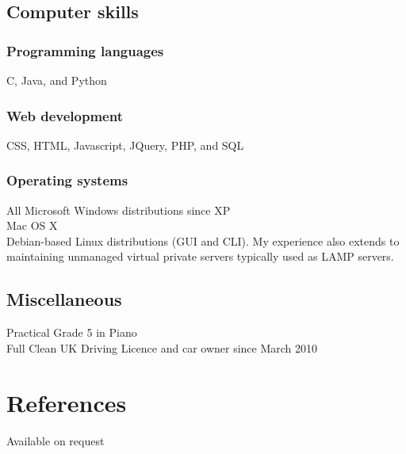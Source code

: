 \documentclass[10pt,a4paper]{article}
\begin{document}
\subsection*{Computer skills}
\subsubsection*{Programming languages}
C, Java, and Python
\subsubsection*{Web development}
CSS, HTML, Javascript, JQuery, PHP, and SQL
\subsubsection*{Operating systems}
All Microsoft Windows distributions since XP\\
Mac OS X\\
Debian-based Linux distributions (GUI and CLI). My experience also extends to 
maintaining unmanaged virtual private servers typically used as LAMP servers.
\subsection*{Miscellaneous}
Practical Grade 5 in Piano\\
Full Clean UK Driving Licence and car owner since March 2010
\section*{References}
Available on request
\end{document}
